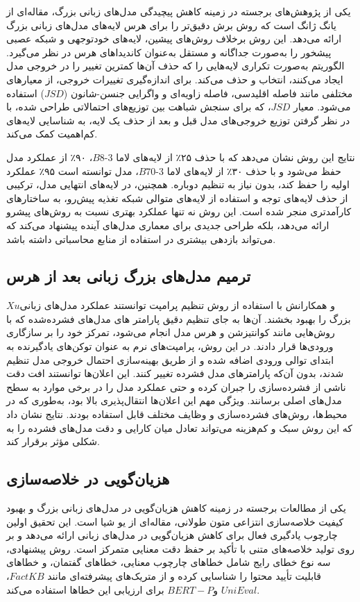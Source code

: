 یکی از پژوهش‌های برجسته در زمینه کاهش پیچیدگی مدل‌های زبانی بزرگ، مقاله‌ای از یانگ ژانگ است که روش برش دقیق‌تر  را برای هرس لایه‌های مدل‌های زبانی بزرگ ارائه می‌دهد. این روش برخلاف روش‌های پیشین، لایه‌های خودتوجهی و شبکه عصبی پیشخور را به‌صورت جداگانه و مستقل به‌عنوان کاندیداهای هرس در نظر می‌گیرد. الگوریتم به‌صورت تکراری لایه‌هایی را که حذف آن‌ها کمترین تغییر را در خروجی مدل ایجاد می‌کنند، انتخاب و حذف می‌کند. برای اندازه‌گیری تغییرات خروجی، از معیارهای مختلفی مانند فاصله اقلیدسی، فاصله زاویه‌ای و واگرایی جنسن-شانون ($JSD$) استفاده می‌شود. معیار $JSD$، که برای سنجش شباهت بین توزیع‌های احتمالاتی طراحی شده، با در نظر گرفتن توزیع خروجی‌های مدل قبل و بعد از حذف یک لایه، به شناسایی لایه‌های کم‌اهمیت کمک می‌کند.

نتایج این روش نشان می‌دهد که با حذف ۲۵٪ از لایه‌های لاما 3-8$B$، ۹۰٪ از عملکرد مدل حفظ می‌شود و با حذف ۳۰٪ از لایه‌های لاما 3-70$B$، مدل توانسته است ۹۵٪ عملکرد اولیه را حفظ کند، بدون نیاز به تنظیم دوباره. همچنین، در لایه‌های انتهایی مدل، ترکیبی از حذف لایه‌های توجه و استفاده از لایه‌های متوالی شبکه تغذیه پیش‌رو، به ساختارهای کارآمدتری منجر شده است. این روش نه تنها عملکرد بهتری نسبت به روش‌های پیشرو ارائه می‌دهد، بلکه طراحی جدیدی برای معماری مدل‌های آینده پیشنهاد می‌کند که می‌تواند بازدهی بیشتری در استفاده از منابع محاسباتی داشته باشد\cite{zhang2024finercut}.

\subsection{ترمیم مدل‌های بزرگ زبانی بعد از هرس}

$Xu$و همکارانش 
با استفاده از روش تنظیم پرامپت  توانستند عملکرد مدل‌های زبانی بزرگ را بهبود بخشند. آن‌ها به جای تنظیم دقیق پارامتر های مدل‌های فشرده‌شده که با روش‌هایی مانند کوانتیزشن و هرس مدل انجام می‌شود، تمرکز خود را بر سازگاری ورودی‌ها قرار دادند. در این روش، پرامپت‌های نرم
 به عنوان توکن‌های یادگیرنده به ابتدای توالی ورودی اضافه شده و از طریق بهینه‌سازی احتمال خروجی مدل تنظیم 
شدند، بدون آن‌که پارامترهای مدل فشرده تغییر کنند. این اعلان‌ها توانستند افت دقت ناشی از فشرده‌سازی را جبران کرده و حتی عملکرد مدل را در برخی موارد به سطح مدل‌های اصلی برسانند. ویژگی مهم این اعلان‌ها انتقال‌پذیری بالا بود، به‌طوری که در محیط‌ها، روش‌های فشرده‌سازی و وظایف مختلف قابل استفاده بودند. نتایج نشان داد که این روش سبک و کم‌هزینه می‌تواند تعادل میان کارایی و دقت مدل‌های فشرده را به شکلی مؤثر برقرار کند\cite{Xu2024SoftPR}. 

\subsection{هزیان‌گویی در خلاصه‌سازی}
یکی از مطالعات برجسته در زمینه کاهش هزیان‌گویی در مدل‌های زبانی بزرگ و بهبود کیفیت خلاصه‌سازی انتزاعی متون طولانی، مقاله‌ای از یو شیا است. این تحقیق اولین چارچوب یادگیری فعال برای کاهش هزیان‌گویی در مدل‌های زبانی ارائه می‌دهد و بر روی تولید خلاصه‌های متنی با تأکید بر حفظ دقت معنایی متمرکز است. روش پیشنهادی، سه نوع خطای رایج شامل خطاهای چارچوب معنایی، خطاهای گفتمان، و خطاهای قابلیت تأیید محتوا را شناسایی کرده و از متریک‌های پیشرفته‌ای مانند $FactKB$، $UniEval$ و$ BERT-P$ برای ارزیابی این خطاها استفاده می‌کند.

